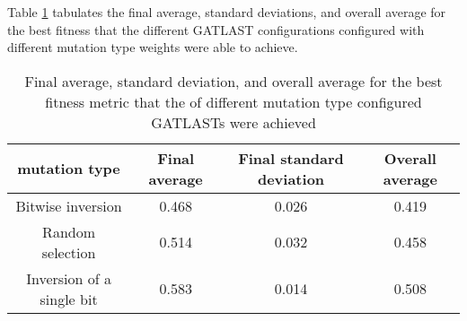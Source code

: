 Table \ref{tab:HP:GA:mutationType:best fitness} tabulates the final average, standard deviations, and overall average for the best fitness that the different GATLAST configurations configured with different mutation type weights were able to achieve.
\begin{table}[tbh!]
\centering
\begin{adjustbox}{trim=0cm 0cm 0cm 0cm, clip=true}
\begin{tabular}{|c|c|c|c|}
\hline
mutation type & Final average & Final standard deviation & Overall average\\
\hline
Bitwise inversion & 0.468 & 0.026 & 0.419\\\hline
Random selection & 0.514 & 0.032 & 0.458\\\hline
Inversion of a single bit & 0.583 & 0.014 & 0.508\\\hline
\end{tabular}
\end{adjustbox}
\caption{Final average, standard deviation, and overall average for the best fitness metric that the of different mutation type configured GATLASTs were achieved}
\label{tab:HP:GA:mutationType:best fitness}
\end{table}